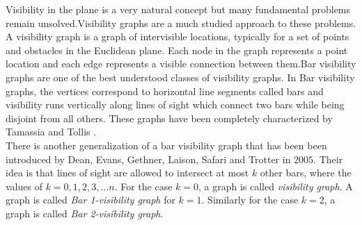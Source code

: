 Visibility in the plane is a very natural concept but many fundamental problems remain unsolved.Visibility graphs are a much studied approach to these problems. A visibility graph is a graph of intervisible locations, typically for a set of points and obstacles in the Euclidean plane. Each node in the graph represents a point location and each edge represents a visible connection between them.Bar visibility graphs are one of the best understood classes of visibility graphs. In Bar visibility graphs, the vertices correspond to horizontal line segments called bars and visibility runs vertically along lines of sight which connect two bars while being disjoint from all others. These graphs have been completely characterized by Tamassia and Tollis \cite{R}.
\\


There is another generalization of a bar visibility graph that has been been introduced by Dean, Evans, Gethner, Laison, Safari and Trotter \cite{M} in $2005$. Their idea is that lines of sight are allowed to intersect at most $k$ other bars, where the values of $k = 0,1,2,3,\ldots n$. For the case $k = 0$, a graph is called \emph{visibility graph}. A graph is called \emph{Bar 1-visibility graph} for $k = 1$. Similarly for the case $k = 2$, a graph is called \emph{Bar 2-visibility graph}.
\\


